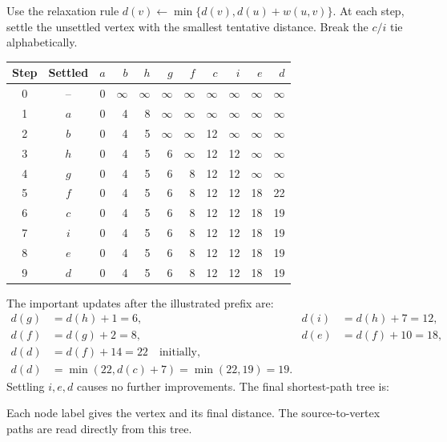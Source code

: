 \documentclass[11pt,a4paper]{article}
\begin{document}
Use the relaxation rule $d(v)\gets\min\{d(v),d(u)+w(u,v)\}$. At each step, settle the unsettled vertex with the smallest tentative distance. Break the $c/i$ tie alphabetically.
\begin{center}\small\begin{tabular}{c|c|rrrrrrrrr}\toprule
Step&Settled&$a$&$b$&$h$&$g$&$f$&$c$&$i$&$e$&$d$\\\midrule
0&--&0&$\infty$&$\infty$&$\infty$&$\infty$&$\infty$&$\infty$&$\infty$&$\infty$\\
1&$a$&0&4&8&$\infty$&$\infty$&$\infty$&$\infty$&$\infty$&$\infty$\\
2&$b$&0&4&5&$\infty$&$\infty$&12&$\infty$&$\infty$&$\infty$\\
3&$h$&0&4&5&6&$\infty$&12&12&$\infty$&$\infty$\\
4&$g$&0&4&5&6&8&12&12&$\infty$&$\infty$\\
5&$f$&0&4&5&6&8&12&12&18&22\\
6&$c$&0&4&5&6&8&12&12&18&19\\
7&$i$&0&4&5&6&8&12&12&18&19\\
8&$e$&0&4&5&6&8&12&12&18&19\\
9&$d$&0&4&5&6&8&12&12&18&19\\\bottomrule
\end{tabular}\normalsize\end{center}
The important updates after the illustrated prefix are:
\begin{align*}
d(g)&=d(h)+1=6,& d(i)&=d(h)+7=12,\\
d(f)&=d(g)+2=8,& d(e)&=d(f)+10=18,\\
d(d)&=d(f)+14=22\quad\text{initially},&&\\
d(d)&=\min(22,d(c)+7)=\min(22,19)=19.&&
\end{align*}
Settling $i,e,d$ causes no further improvements. The final shortest-path tree is:
\begin{center}\end{center}
Each node label gives the vertex and its final distance. The source-to-vertex paths are read directly from this tree.
\end{document}
